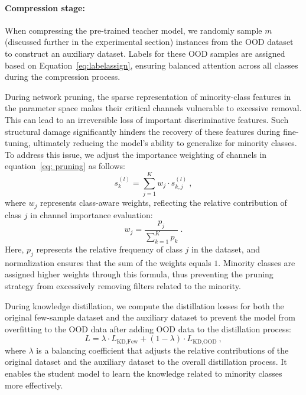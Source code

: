 \documentclass[twoside,11pt]{article}
\begin{document}
\paragraph{Compression stage:} When compressing the pre-trained teacher model, we randomly sample $ m $ (discussed further in the experimental section) instances from the OOD dataset to construct an auxiliary dataset. Labels for these OOD samples are assigned based on Equation~\ref{eq:labelassign}, ensuring balanced attention across all classes during the compression process.

During network pruning, the sparse representation of minority-class features in the parameter space makes their critical channels vulnerable to excessive removal. This can lead to an irreversible loss of important discriminative features. Such structural damage significantly hinders the recovery of these features during fine-tuning, ultimately reducing the model's ability to generalize for minority classes. To address this issue, we adjust the importance weighting of channels in equation~\ref{eq: pruning} as follows:
\begin{equation}
s_k^{(l)} = \sum_{j=1}^K w_j \cdot s_{k,j}^{(l)}\ ,
\end{equation}
where $ w_j $ represents class-aware weights, reflecting the relative contribution of class $ j $ in channel importance evaluation:
\begin{equation}
w_j = \frac{p_j}{\sum_{k=1}^K p_k}\ .
\end{equation}
Here, $p_j$ represents the relative frequency of class $j$ in the dataset, and normalization ensures that the sum of the weights equals $ 1 $. Minority classes are assigned higher weights through this formula, thus preventing the pruning strategy from excessively removing filters related to the minority.

During knowledge distillation, we compute the distillation losses for both the original few-sample dataset and the auxiliary dataset to prevent the model from overfitting to the OOD data after adding OOD data to the distillation process: 
\begin{equation}
\label{eq: knowledgedistillation}
L = \lambda \cdot L_{\text{KD,Few}} + (1-\lambda) \cdot L_{\text{KD,OOD}}\ ,
\end{equation}
where $ \lambda $ is a balancing coefficient that adjusts the relative contributions of the original dataset and the auxiliary dataset to the overall distillation process. It enables the student model to learn the knowledge related to minority classes more effectively.
\end{document}
